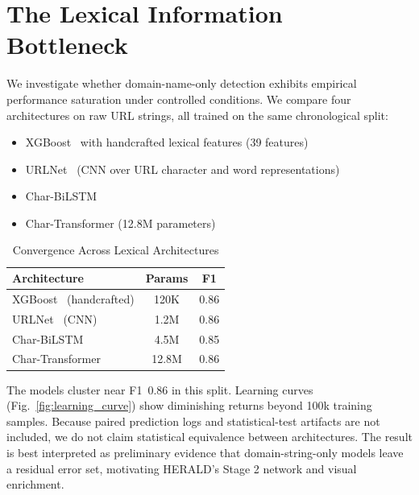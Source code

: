 \documentclass[conference]{IEEEtran}
\begin{document}
\section{The Lexical Information Bottleneck}
\label{sec:bottleneck}

We investigate whether domain-name-only detection exhibits empirical performance saturation under controlled conditions. We compare four architectures on raw URL strings, all trained on the same chronological split:

\begin{itemize}
    \item XGBoost~\cite{xgboost} with handcrafted lexical features (39 features)
    \item URLNet~\cite{le_urlnet} (CNN over URL character and word representations)
    \item Char-BiLSTM
    \item Char-Transformer (12.8M parameters)
\end{itemize}

\begin{table}[htbp]
\centering
\caption{Convergence Across Lexical Architectures}
\label{tab:architecture_convergence}

\scriptsize
\setlength{\tabcolsep}{4pt}

\begin{tabularx}{\columnwidth}{lcc}
\toprule

\textbf{Architecture} &
\textbf{Params} &
\textbf{F1} \\

\midrule

XGBoost~\cite{xgboost} (handcrafted) & 120K & 0.86 \\
URLNet~\cite{le_urlnet} (CNN) & 1.2M & 0.86 \\
Char-BiLSTM & 4.5M & 0.85 \\
Char-Transformer & 12.8M & 0.86 \\

\bottomrule
\end{tabularx}
\end{table}

The models cluster near F1~0.86 in this split. Learning curves (Fig.~\ref{fig:learning_curve}) show diminishing returns beyond 100k training samples. Because paired prediction logs and statistical-test artifacts are not included, we do not claim statistical equivalence between architectures. The result is best interpreted as preliminary evidence that domain-string-only models leave a residual error set, motivating HERALD's Stage 2 network and visual enrichment.
\end{document}
